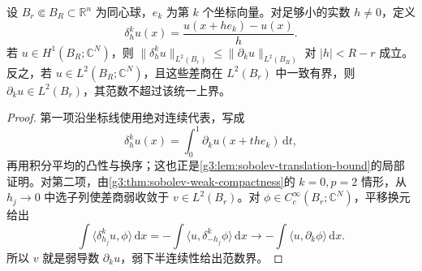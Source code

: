 \begin{lemma}\label{g3:lem:difference-quotient-criterion}
	设 \(B_r\Subset B_R\subset\mathbb R^n\) 为同心球，\(e_k\) 为第 \(k\) 个坐标向量。对足够小的实数 \(h\ne0\)，定义
	\[
		\delta_h^ku(x)=\frac{u(x+he_k)-u(x)}h.
	\]
	若 \(u\in H^1(B_R;\mathbb C^N)\)，则
	\(\|\delta_h^ku\|_{L^2(B_r)}\le\|\partial_ku\|_{L^2(B_R)}\) 对 \(|h|<R-r\) 成立。反之，若 \(u\in L^2(B_R;\mathbb C^N)\)，且这些差商在 \(L^2(B_r)\) 中一致有界，则 \(\partial_ku\in L^2(B_r)\)，其范数不超过该统一上界。
\end{lemma}
\begin{proof}
	第一项沿坐标线使用绝对连续代表，写成
	\[
		\delta_h^ku(x)=\int_0^1\partial_ku(x+the_k)\,\mathrm dt,
	\]
	再用积分平均的凸性与换序；这也正是\cref{g3:lem:sobolev-translation-bound}的局部证明。对第二项，由\cref{g3:thm:sobolev-weak-compactness}的 \(k=0,p=2\) 情形，从 \(h_j\to0\) 中选子列使差商弱收敛于 \(v\in L^2(B_r)\)。对 \(\phi\in C_c^\infty(B_r;\mathbb C^N)\)，平移换元给出
	\[
		\int\langle\delta_{h_j}^ku,\phi\rangle\,\mathrm dx
		=-\int\langle u,\delta_{-h_j}^k\phi\rangle\,\mathrm dx
		\longrightarrow-\int\langle u,\partial_k\phi\rangle\,\mathrm dx.
	\]
	所以 \(v\) 就是弱导数 \(\partial_ku\)，弱下半连续性给出范数界。
\end{proof}

